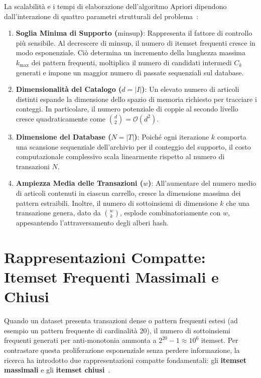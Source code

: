 La scalabilità e i tempi di elaborazione dell'algoritmo Apriori dipendono dall'interazione di quattro parametri strutturali del problema~\cite{tan2018}:
\begin{enumerate}
    \item \textbf{Soglia Minima di Supporto ($\mathrm{minsup}$)}: Rappresenta il fattore di controllo più sensibile. Al decrescere di $\mathrm{minsup}$, il numero di itemset frequenti cresce in modo esponenziale. Ciò determina un incremento della lunghezza massima $k_{\max}$ dei pattern frequenti, moltiplica il numero di candidati intermedi $C_k$ generati e impone un maggior numero di passate sequenziali sul database.
    \item \textbf{Dimensionalità del Catalogo ($d = |I|$)}: Un elevato numero di articoli distinti espande la dimensione dello spazio di memoria richiesto per tracciare i conteggi. In particolare, il numero potenziale di coppie al secondo livello cresce quadraticamente come $\binom{d}{2} = \mathcal{O}(d^2)$.
    \item \textbf{Dimensione del Database ($N = |T|$)}: Poiché ogni iterazione $k$ comporta una scansione sequenziale dell'archivio per il conteggio del supporto, il costo computazionale complessivo scala linearmente rispetto al numero di transazioni $N$.
    \item \textbf{Ampiezza Media delle Transazioni ($w$)}: All'aumentare del numero medio di articoli contenuti in ciascun carrello, cresce la dimensione massima dei pattern estraibili. Inoltre, il numero di sottoinsiemi di dimensione $k$ che una transazione genera, dato da $\binom{w}{k}$, esplode combinatoriamente con $w$, appesantendo l'attraversamento degli alberi hash.
\end{enumerate}

\section[Rappresentazioni Compatte: Itemset Massimali e Chiusi]{Rappresentazioni Compatte: Itemset Frequenti Massimali e Chiusi}
\label{sec:dm-maximal-closed-itemsets}

Quando un dataset presenta transazioni dense o pattern frequenti estesi (ad esempio un pattern frequente di cardinalità 20), il numero di sottoinsiemi frequenti generati per anti-monotonia ammonta a $2^{20} - 1 \approx 10^6$ itemset. Per contrastare questa proliferazione esponenziale senza perdere informazione, la ricerca ha introdotto due rappresentazioni compatte fondamentali: gli \textbf{itemset massimali} e gli \textbf{itemset chiusi}~\cite{tan2018}.

